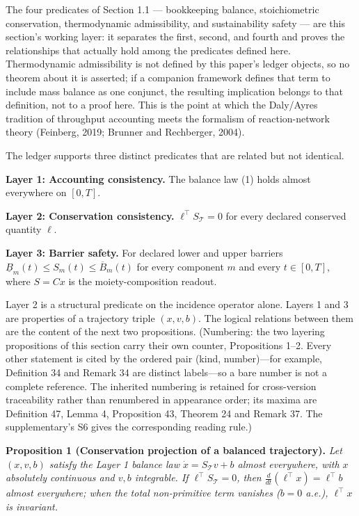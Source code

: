 \documentclass[11pt]{article}
\begin{document}
The four predicates of Section 1.1 --- bookkeeping balance, stoichiometric conservation, thermodynamic admissibility, and sustainability safety --- are this section's working layer: it separates the first, second, and fourth and proves the relationships that actually hold among the predicates defined here. Thermodynamic admissibility is not defined by this paper's ledger objects, so no theorem about it is asserted; if a companion framework defines that term to include mass balance as one conjunct, the resulting implication belongs to that definition, not to a proof here. This is the point at which the Daly/Ayres tradition of throughput accounting meets the formalism of reaction-network theory (Feinberg, 2019; Brunner and Rechberger, 2004).

The ledger supports three distinct predicates that are related but not identical.

\textbf{Layer 1: Accounting consistency.} The balance law (1) holds almost everywhere on \([0,T]\).

\textbf{Layer 2: Conservation consistency.} \(\ell^\top S_{\mathcal{T}} = 0\) for every declared conserved quantity \(\ell\).

\textbf{Layer 3: Barrier safety.} For declared lower and upper barriers \(\underline{B}_m(t) \le S_m(t) \le \overline{B}_m(t)\) for every component \(m\) and every \(t \in [0,T]\), where \(S = Cx\) is the moiety-composition readout.

Layer 2 is a structural predicate on the incidence operator alone. Layers 1 and 3 are properties of a trajectory triple \((x, v, b)\). The logical relations between them are the content of the next two propositions. (Numbering: the two layering propositions of this section carry their own counter, Propositions 1--2. Every other statement is cited by the ordered pair (kind, number)---for example, Definition 34 and Remark 34 are distinct labels---so a bare number is not a complete reference. The inherited numbering is retained for cross-version traceability rather than renumbered in appearance order; its maxima are Definition 47, Lemma 4, Proposition 43, Theorem 24 and Remark 37. The supplementary's S6 gives the corresponding reading rule.)

\textbf{Proposition 1 (Conservation projection of a balanced trajectory).} \emph{Let \((x,v,b)\) satisfy the Layer 1 balance law \(\dot x=S_{\mathcal{T}}v+b\) almost everywhere, with \(x\) absolutely continuous and \(v,b\) integrable. If \(\ell^\top S_{\mathcal{T}} = 0\), then \(\frac{d}{dt}(\ell^\top x) = \ell^\top b\) almost everywhere; when the total non-primitive term vanishes (\(b=0\) a.e.), \(\ell^\top x\) is invariant.}
\end{document}
